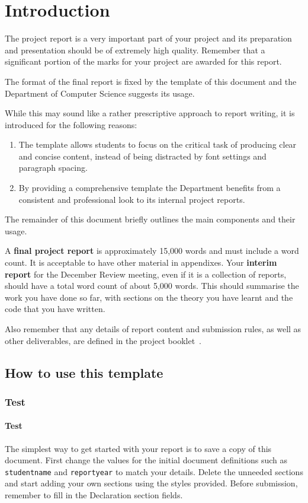 \documentclass[]{final_report}
\begin{document}
\chapter{Introduction}

The project report is a very important part of your project and its preparation and presentation should be of extremely high quality. Remember that a significant portion of the marks for your project are awarded for this report. 

The format of the final report is fixed by the template of this document and the Department of Computer Science suggests its usage. 

While this may sound like a rather prescriptive approach to report writing, it is introduced for the following reasons:
\begin{enumerate}
 \item The template allows students to focus on the critical task of producing clear and concise content, instead of being distracted by font settings and paragraph spacing. 
 \item By providing a comprehensive template the Department benefits from a consistent and professional look to its internal project reports.
\end{enumerate}

The remainder of this document briefly outlines the main components and their usage.

A \textbf{final project report} is approximately 15,000 words and must include a word count. It is acceptable to have other material in appendixes.  
Your \textbf{interim report} for the December Review meeting, even if it is a collection of reports, should have a total word count of about 5,000 words. 
This should summarise the work you have done so far, with sections on the theory you have learnt and the code that you have written.

Also remember that any details of report content and submission rules, as well as other deliverables, are defined in the project booklet~.

\section{How to use this template}
\subsection{Test}
\subsubsection{Test}
The simplest way to get started with your report is to save a copy of this document. 
First change the values for the initial document definitions such as \verb|studentname| and \verb|reportyear| to match your details.
Delete the unneeded sections and start adding your own sections using the styles provided.
Before submission, remember to fill in the Declaration section fields.
\end{document}
